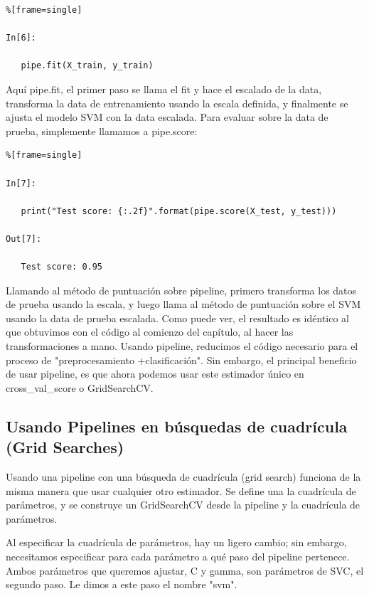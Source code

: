    \begin{lstlisting}%[frame=single]
      
In[6]:
   
   pipe.fit(X_train, y_train)   
   \end{lstlisting}  
   
   Aquí {\ttfamily pipe.fit},  el primer paso se llama el {\ttfamily fit} y hace el escalado de la data,  transforma la data de entrenamiento usando la escala definida, y finalmente se ajusta el modelo  SVM con la data escalada. Para evaluar sobre la data de prueba, simplemente llamamos a {\ttfamily pipe.score}:
   
   
   \begin{lstlisting}%[frame=single]
   
In[7]:
   
   print("Test score: {:.2f}".format(pipe.score(X_test, y_test)))
   
Out[7]:
   
   Test score: 0.95      
   \end{lstlisting}
   
   
   Llamando al método de puntuación sobre   pipeline,  primero transforma los datos de prueba usando la
   escala, y luego llama al método de puntuación sobre  el SVM usando la data de prueba escalada.
   Como  puede ver, el resultado es idéntico al que obtuvimos con el código al comienzo del
   capítulo, al hacer las transformaciones a mano.   Usando   pipeline, reducimos el
   código necesario para el proceso de "{}preprocesamiento {\scriptsize +}clasificación"{}. 
   Sin embargo, el principal beneficio de  usar  pipeline,  es que ahora podemos usar este estimador único en
   {\ttfamily cross\_val\_score} o   {\ttfamily GridSearchCV}.
   
   
   
   
   \subsection{Usando Pipelines en búsquedas de cuadrícula \\(Grid Searches)}
   
   Usando una pipeline con una búsqueda de cuadrícula  (grid search) funciona de la misma manera que usar cualquier otro estimador. Se define una la cuadrícula de parámetros,   y se construye un {\ttfamily GridSearchCV}  desde  la pipeline y la cuadrícula de parámetros. 
   
   Al especificar  la cuadrícula de parámetros, hay un ligero cambio; sin embargo,  necesitamos especificar para cada parámetro a qué paso del pipeline pertenece.   Ambos parámetros que queremos ajustar, {\ttfamily C  } y  {\ttfamily gamma}, son parámetros de SVC, el segundo paso. Le dimos a este paso el nombre  {\ttfamily  "{}svm"{}.}
   
